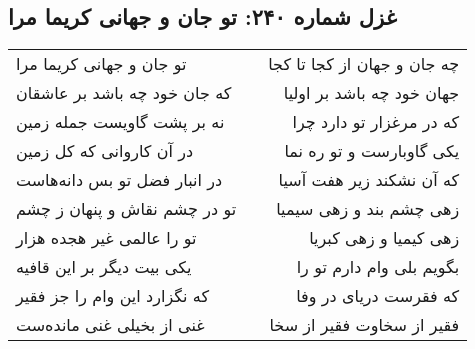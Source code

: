 \begin{center}
\section*{غزل شماره ۲۴۰: تو جان و جهانی کریما مرا}
\label{sec:0240}
\begin{longtable}{l p{0.5cm} r}
تو جان و جهانی کریما مرا
&&
چه جان و جهان از کجا تا کجا
\\
که جان خود چه باشد بر عاشقان
&&
جهان خود چه باشد بر اولیا
\\
نه بر پشت گاویست جمله زمین
&&
که در مرغزار تو دارد چرا
\\
در آن کاروانی که کل زمین
&&
یکی گاوبارست و تو ره نما
\\
در انبار فضل تو بس دانه‌هاست
&&
که آن نشکند زیر هفت آسیا
\\
تو در چشم نقاش و پنهان ز چشم
&&
زهی چشم بند و زهی سیمیا
\\
تو را عالمی غیر هجده هزار
&&
زهی کیمیا و زهی کبریا
\\
یکی بیت دیگر بر این قافیه
&&
بگویم بلی وام دارم تو را
\\
که نگزارد این وام را جز فقیر
&&
که فقرست دریای در وفا
\\
غنی از بخیلی غنی مانده‌ست
&&
فقیر از سخاوت فقیر از سخا
\\
\end{longtable}
\end{center}
